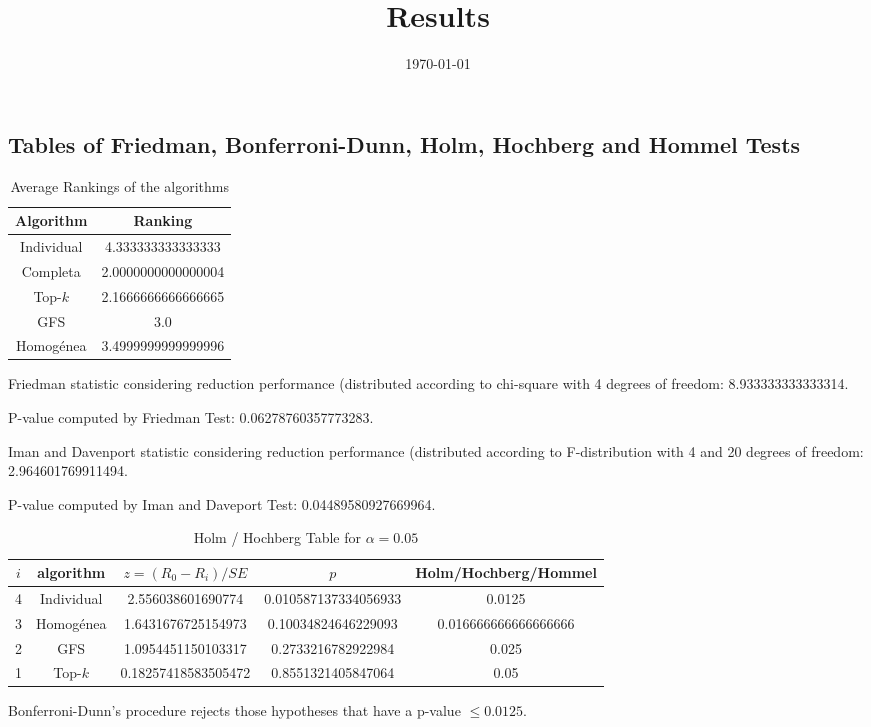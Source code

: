 \documentclass[a4paper,10pt]{article}
\title{Results}
\author{}
\date{\today}
\begin{document}
\begin{landscape}
\oddsidemargin 0in \topmargin 0in\maketitle
\section{Tables of Friedman, Bonferroni-Dunn, Holm, Hochberg and Hommel Tests}
\begin{table}[!htp]
\centering
\caption{Average Rankings of the algorithms
}\begin{tabular}{c|c}
Algorithm&Ranking\\
\hline
Individual&4.333333333333333\\
Completa&2.0000000000000004\\
Top-$k$&2.1666666666666665\\
GFS&3.0\\
Homogénea&3.4999999999999996\\
\end{tabular}
\end{table}


Friedman statistic considering reduction performance (distributed according to chi-square with 4 degrees of freedom: 8.933333333333314.


P-value computed by Friedman Test: 0.06278760357773283.\newline

Iman and Davenport statistic considering reduction performance (distributed according to F-distribution with 4 and 20 degrees of freedom: 2.964601769911494.


P-value computed by Iman and Daveport Test: 0.04489580927669964.\newline

\begin{table}[!htp]
\centering\tiny
\caption{Holm / Hochberg Table for $\alpha=0.05$}
\begin{tabular}{ccccc}
$i$&algorithm&$z=(R_0 - R_i)/SE$&$p$&Holm/Hochberg/Hommel\\
\hline
4&Individual&2.556038601690774&0.010587137334056933&0.0125\\
3&Homogénea&1.6431676725154973&0.10034824646229093&0.016666666666666666\\
2&GFS&1.0954451150103317&0.2733216782922984&0.025\\
1&Top-$k$&0.18257418583505472&0.8551321405847064&0.05\\
\hline
\end{tabular}
\end{table}
Bonferroni-Dunn's procedure rejects those hypotheses that have a p-value $\le0.0125$.



\end{landscape}
\end{document}
